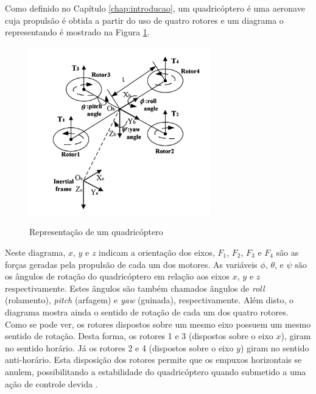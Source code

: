 Como definido no Capítulo \ref{chap:introducao}, um quadricóptero é uma aeronave cuja propulsão é obtida a partir do uso de quatro rotores e um diagrama o representando é mostrado na Figura \ref{fig:drone_diagram}. 


\begin{figure}[!htb]
    \centering
    \caption{Representação de um quadricóptero}
    \includegraphics[width=0.7\textwidth]{./04-figuras/drone_diagram/drone_test_sep-1}
    \label{fig:drone_diagram}
\end{figure}

Neste diagrama, $x$, $y$ e $z$ indicam a orientação dos eixos, $F_1$, $F_2$, $F_3$ e $F_4$ são as forças geradas pela propulsão de cada um dos motores. As variáveis $\phi$, $\theta$, e $\psi$ são os ângulos de rotação do quadricóptero em relação aos eixos $x$, $y$ e $z$ respectivamente. Estes ângulos são também chamados ângulos de \textit{roll} (rolamento), \textit{pitch} (arfagem) e \textit{yaw} (guinada), respectivamente. Além disto, o diagrama mostra ainda o sentido de rotação de cada um dos quatro rotores. Como se pode ver, os rotores dispostos sobre um mesmo eixo possuem um mesmo sentido de rotação. Desta forma, os rotores 1 e 3 (dispostos sobre o eixo $x$), giram no sentido horário. Já os rotores 2 e 4 (dispostos sobre o eixo $y$) giram no sentido anti-horário. Esta disposição dos rotores permite que os empuxos horizontais se anulem, possibilitando a estabilidade do quadricóptero quando submetido a uma ação de controle devida \cite[p.~1]{Ariffanan2014}.

